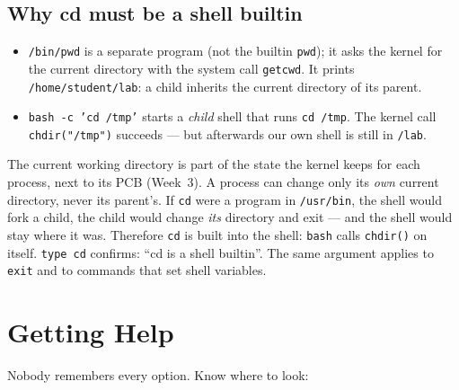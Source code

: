 \documentclass[11pt,a4paper]{article}
\newcommand{\cmd}[1]{\texttt{#1}}
\begin{document}
\subsection{Why cd must be a shell builtin}
\label{sec:cdbuiltin}


\begin{itemize}
  \item \texttt{/bin/pwd} is a separate program (not the builtin \cmd{pwd}); it asks the kernel for the current directory with the system call \texttt{getcwd}. It prints \texttt{/home/student/lab}: a child inherits the current directory of its parent.
  \item \cmd{bash -c 'cd /tmp'} starts a \emph{child} shell that runs \cmd{cd /tmp}. The kernel call \texttt{chdir("/tmp")} succeeds --- but afterwards our own shell is still in \texttt{\tl/lab}.
\end{itemize}

\begin{keyidea}
The current working directory is part of the state the kernel keeps for each process, next to its PCB (Week~3). A process can change only its \emph{own} current directory, never its parent's. If \cmd{cd} were a program in \texttt{/usr/bin}, the shell would fork a child, the child would change \emph{its} directory and exit --- and the shell would stay where it was. Therefore \cmd{cd} is built into the shell: \cmd{bash} calls \texttt{chdir()} on itself. \cmd{type cd} confirms: ``cd is a shell builtin''. The same argument applies to \cmd{exit} and to commands that set shell variables.
\end{keyidea}

\section{Getting Help}
\label{sec:help}

Nobody remembers every option. Know where to look:
\end{document}
